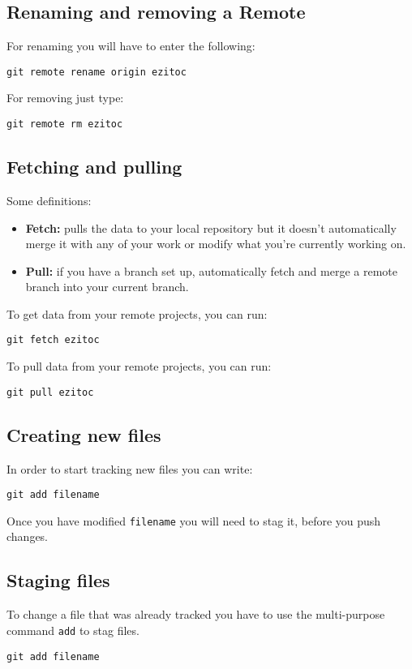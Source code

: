 \documentclass[a4paper,12pt]{article}
\begin{document}
\subsection{Renaming and removing a Remote}
For renaming you will have to enter the following:
\begin{lstlisting}[style=input]
git remote rename origin ezitoc
\end{lstlisting}

For removing just type:
\begin{lstlisting}[style=input]
git remote rm ezitoc
\end{lstlisting}

\subsection{Fetching and pulling}
Some definitions:
\begin{itemize}
  \item {\textbf{Fetch:}} pulls the data to your local repository but it
    doesn't automatically merge it with any of your work or modify what you're
    currently working on.
  \item {\textbf{Pull:}} if you have a branch set up, automatically fetch and
    merge a remote branch into your current branch.
\end{itemize}

To get data from your remote projects, you can run:
\begin{lstlisting}[style=input]
git fetch ezitoc
\end{lstlisting}

To pull data from your remote projects, you can run:
\begin{lstlisting}[style=input]
git pull ezitoc
\end{lstlisting}

\subsection{Creating new files}
In order to start tracking new files you can write:
\begin{lstlisting}[style=input]
git add filename
\end{lstlisting}
Once you have modified \texttt{filename} you will need to stag it, before you
push changes.

\subsection{Staging files}
To change a file that was already tracked you have to use the multi-purpose
command \texttt{add} to stag files.
\begin{lstlisting}[style=input]
git add filename
\end{lstlisting}
\end{document}
